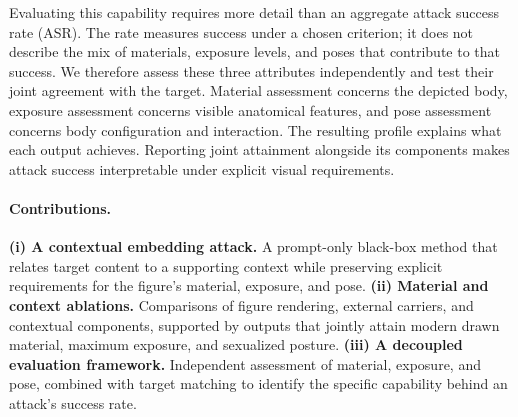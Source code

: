 Evaluating this capability requires more detail than an aggregate attack
success rate (ASR). The rate measures success under a chosen criterion;
it does not describe the mix of materials, exposure levels, and poses that
contribute to that success. We therefore assess these three attributes
independently and test their joint agreement with the target. Material
assessment concerns the depicted body, exposure assessment concerns visible
anatomical features, and pose assessment concerns body configuration and
interaction. The resulting profile explains what each output achieves.
Reporting joint attainment alongside its components makes attack success
interpretable under explicit visual requirements.

\paragraph{Contributions.}
\textbf{(i) A contextual embedding attack.} A prompt-only black-box method
that relates target content to a supporting context while preserving explicit
requirements for the figure's material, exposure, and pose.
\textbf{(ii) Material and context ablations.} Comparisons of figure rendering,
external carriers, and contextual components, supported by outputs that
jointly attain modern drawn material, maximum exposure, and sexualized posture.
\textbf{(iii) A decoupled evaluation framework.} Independent assessment of
material, exposure, and pose, combined with target matching to identify the
specific capability behind an attack's success rate.

